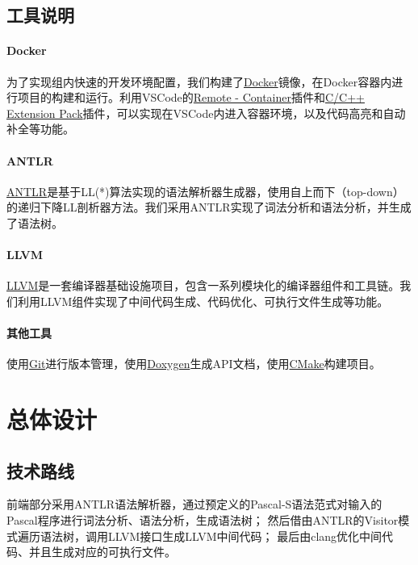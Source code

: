 \documentclass[lang=cn,11pt,a4paper,cite=authornum]{paper}
\begin{document}
\subsection{工具说明}

\paragraph{Docker} 为了实现组内快速的开发环境配置，我们构建了\href{https://www.docker.com/}{Docker}镜像，在Docker容器内进行项目的构建和运行。利用VSCode的\href{https://marketplace.visualstudio.com/items?itemName=ms-vscode-remote.remote-containers}{Remote - Container}插件和\href{https://marketplace.visualstudio.com/items?itemName=ms-vscode.cpptools-extension-pack}{C/C++ Extension Pack}插件，可以实现在VSCode内进入容器环境，以及代码高亮和自动补全等功能。

\paragraph{ANTLR} \href{https://www.antlr.org/}{ANTLR}是基于LL(*)算法实现的语法解析器生成器，使用自上而下（top-down）的递归下降LL剖析器方法。我们采用ANTLR实现了词法分析和语法分析，并生成了语法树。

\paragraph{LLVM} \href{https://llvm.org/}{LLVM}是一套编译器基础设施项目，包含一系列模块化的编译器组件和工具链。我们利用LLVM组件实现了中间代码生成、代码优化、可执行文件生成等功能。

\paragraph{其他工具} 使用\href{https://git-scm.com/}{Git}进行版本管理，使用\href{https://www.doxygen.nl/}{Doxygen}生成API文档，使用\href{https://cmake.org/}{CMake}构建项目。

\section{总体设计}

\subsection{技术路线}

前端部分采用ANTLR语法解析器，通过预定义的Pascal-S语法范式对输入的Pascal程序进行词法分析、语法分析，生成语法树；
然后借由ANTLR的Visitor模式遍历语法树，调用LLVM接口生成LLVM中间代码；
最后由clang优化中间代码、并且生成对应的可执行文件。
\end{document}
